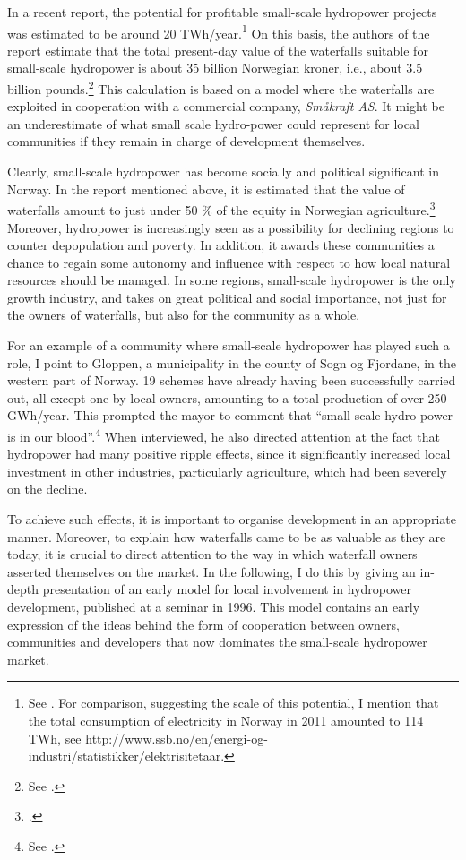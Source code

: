 In a recent report, the potential for profitable small-scale hydropower projects was estimated to be around 20 TWh/year.\footnote{See \cite{aanesland09}. For comparison, suggesting the scale of this potential, I mention that the total consumption of electricity in Norway in 2011 amounted to 114 TWh, see http://www.ssb.no/en/energi-og-industri/statistikker/elektrisitetaar.} On this basis, the authors of the report estimate that the total present-day value of the waterfalls suitable for small-scale hydropower is about 35 billion Norwegian kroner, i.e., about 3.5 billion pounds.\footnote{See \cite[1]{aanesland09}.} This calculation is based on a model where the waterfalls are exploited in cooperation with a commercial company, {\it Småkraft AS}. It might be an underestimate of what small scale hydro-power could represent for local communities if they remain in charge of development themselves.

Clearly, small-scale hydropower has become socially and political significant in Norway. In the report mentioned above, it is estimated that the value of waterfalls amount to just under 50 \% of the equity in Norwegian agriculture.\footcite[1]{aanesland09} Moreover, hydropower is increasingly seen as a possibility for declining regions to counter depopulation and poverty. In addition, it awards these communities a chance to regain some autonomy and influence with respect to how local natural resources should be managed. In some regions, small-scale hydropower is the only growth industry, and takes on great political and social importance, not just for the owners of waterfalls, but also for the community as a whole.

For an example of a community where small-scale hydropower has played such a role, I point to Gloppen, a municipality in the county of Sogn og Fjordane, in the western part of Norway. 19 schemes have already having been successfully carried out, all except one by local owners, amounting to a total production of over 250 GWh/year. This prompted the mayor to comment that ``small scale hydro-power is in our blood''.\footnote{See \cite{starheim12}.} When interviewed, he also directed attention at the fact that hydropower had many positive ripple effects, since it significantly increased local investment in other industries, particularly agriculture, which had been severely on the decline.

To achieve such effects, it is important to organise development in an appropriate manner. Moreover, to explain how waterfalls came to be as valuable as they are today, it is crucial to direct attention to the way in which waterfall owners asserted themselves on the market. In the following, I do this by giving an in-depth presentation of an early model for local involvement in hydropower development, published at a seminar in 1996. This model contains an early expression of the ideas behind the form of cooperation between owners, communities and developers that now dominates the small-scale hydropower market. 

